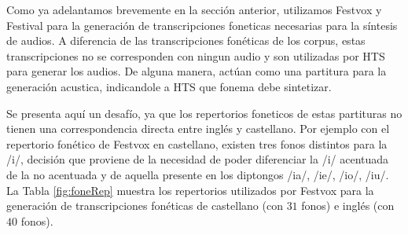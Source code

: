 
Como ya adelantamos brevemente en la sección anterior, utilizamos Festvox y Festival para la generación de transcripciones foneticas necesarias para la síntesis de audios. A diferencia de las transcripciones fonéticas de los corpus, estas transcripciones no se corresponden con ningun audio y son utilizadas por HTS para generar los audios. De alguna manera, actúan como una partitura para la generación acustica, indicandole a HTS que fonema debe sintetizar.

Se presenta aquí un desafío, ya que los repertorios foneticos de estas partituras no tienen una correspondencia directa entre inglés y castellano. Por ejemplo con el repertorio fonético de Festvox en castellano, existen tres fonos distintos para la /i/, decisión que proviene de la necesidad de poder diferenciar la /i/ acentuada de la no acentuada  y de aquella presente en los diptongos /ia/, /ie/, /io/, /iu/. La Tabla \ref{fig:foneRep} muestra los repertorios utilizados por Festvox para la generación de transcripciones fonéticas de castellano (con $31$ fonos) e inglés (con $40$ fonos).

